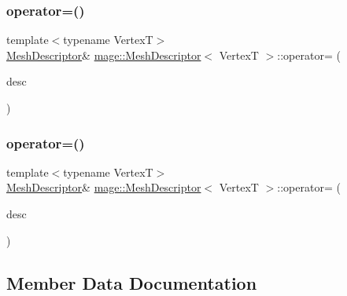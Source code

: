 \hypertarget{structmage_1_1_mesh_descriptor_aef6a9568a8d4516dbeff4d8f665ca213}{}\label{structmage_1_1_mesh_descriptor_aef6a9568a8d4516dbeff4d8f665ca213} 
\subsubsection{\texorpdfstring{operator=()}{operator=()}\hspace{0.1cm}{\footnotesize\ttfamily [1/2]}}
{\footnotesize\ttfamily template$<$typename VertexT$>$ \\
\hyperlink{structmage_1_1_mesh_descriptor}{Mesh\+Descriptor}\& \hyperlink{structmage_1_1_mesh_descriptor}{mage\+::\+Mesh\+Descriptor}$<$ VertexT $>$\+::operator= (\begin{DoxyParamCaption}\item[{const \hyperlink{structmage_1_1_mesh_descriptor}{Mesh\+Descriptor}$<$ VertexT $>$ \&}]{desc }\end{DoxyParamCaption})\hspace{0.3cm}{\ttfamily [default]}}

\hypertarget{structmage_1_1_mesh_descriptor_aee596eaa945924860d9a26daa58d8f45}{}\label{structmage_1_1_mesh_descriptor_aee596eaa945924860d9a26daa58d8f45} 
\subsubsection{\texorpdfstring{operator=()}{operator=()}\hspace{0.1cm}{\footnotesize\ttfamily [2/2]}}
{\footnotesize\ttfamily template$<$typename VertexT$>$ \\
\hyperlink{structmage_1_1_mesh_descriptor}{Mesh\+Descriptor}\& \hyperlink{structmage_1_1_mesh_descriptor}{mage\+::\+Mesh\+Descriptor}$<$ VertexT $>$\+::operator= (\begin{DoxyParamCaption}\item[{\hyperlink{structmage_1_1_mesh_descriptor}{Mesh\+Descriptor}$<$ VertexT $>$ \&\&}]{desc }\end{DoxyParamCaption})\hspace{0.3cm}{\ttfamily [default]}}



\subsection{Member Data Documentation}
\hypertarget{structmage_1_1_mesh_descriptor_a7e769c8d1d81b3514b951b306865dc88}{}\label{structmage_1_1_mesh_descriptor_a7e769c8d1d81b3514b951b306865dc88} 
